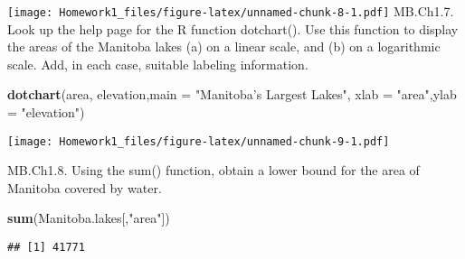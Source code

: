 \documentclass[hyperref,]{ctexart}
\newenvironment{Shaded}{\begin{snugshade}}{\end{snugshade}}
\newcommand{\DataTypeTok}[1]{\textcolor[rgb]{0.13,0.29,0.53}{#1}}
\newcommand{\KeywordTok}[1]{\textcolor[rgb]{0.13,0.29,0.53}{\textbf{#1}}}
\newcommand{\NormalTok}[1]{#1}
\newcommand{\StringTok}[1]{\textcolor[rgb]{0.31,0.60,0.02}{#1}}
\begin{document}
\texttt{[image: Homework1\_files/figure-latex/unnamed-chunk-8-1.pdf]}
MB.Ch1.7. Look up the help page for the R function dotchart(). Use this
function to display the areas of the Manitoba lakes (a) on a linear
scale, and (b) on a logarithmic scale. Add, in each case, suitable
labeling information.

\begin{Shaded}
\begin{Highlighting}[]
\KeywordTok{dotchart}\NormalTok{(area, elevation,}\DataTypeTok{main =} \StringTok{"Manitoba’s Largest Lakes"}\NormalTok{,  }\DataTypeTok{xlab =} \StringTok{"area"}\NormalTok{,}\DataTypeTok{ylab =} \StringTok{"elevation"}\NormalTok{)}
\end{Highlighting}
\end{Shaded}

\texttt{[image: Homework1\_files/figure-latex/unnamed-chunk-9-1.pdf]}

MB.Ch1.8. Using the sum() function, obtain a lower bound for the area of
Manitoba covered by water.

\begin{Shaded}
\begin{Highlighting}[]
\KeywordTok{sum}\NormalTok{(Manitoba.lakes[,}\StringTok{"area"}\NormalTok{])}
\end{Highlighting}
\end{Shaded}

\begin{verbatim}
## [1] 41771
\end{verbatim}
\end{document}
